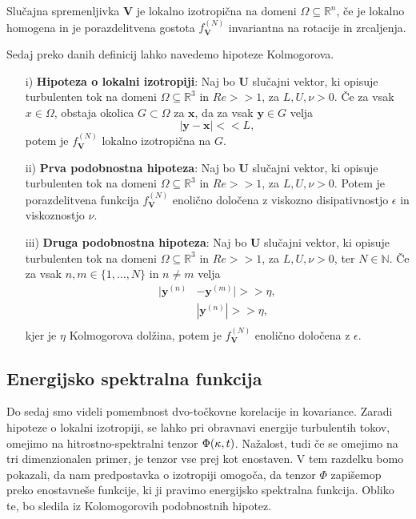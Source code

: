 \documentclass[mat2, tisk]{fmfdelo}
\newcommand{\R}{\mathbb R}
\newcommand{\N}{\mathbb N}
\newcommand{\bd}{\textbf}
\begin{document}
\begin{definicija}
Slučajna spremenljivka $\bd{V}$ je lokalno izotropična na domeni 
$\Omega \subseteq \R^n$, če je lokalno homogena in je porazdelitvena 
gostota $f_\bd{V}^{(N)}$ invariantna na rotacije in zrcaljenja.
\end{definicija}

Sedaj preko danih definicij lahko navedemo hipoteze Kolmogorova.

\begin{enumerate}
  \item[i)] \textbf{Hipoteza o lokalni izotropiji}: Naj bo $\bd{U}$ slučajni vektor,
  ki opisuje turbulenten tok na domeni $\Omega \subseteq \R^3$ in $Re >\!\!> 1$, za $L, U, \nu > 0$. Če 
  za vsak $x\in \Omega$, obstaja okolica $G \subset \Omega$ za $\bd{x}$, da za vsak 
  $\bd{y}\in G$ velja $$ |\bd{y} - \bd{x}| <\!\!< L,$$ potem je $f_\bd{V}^{(N)}$ lokalno 
  izotropična na $G$.
  \item[ii)] \textbf{Prva podobnostna hipoteza}: Naj bo $\bd{U}$ slučajni vektor,
  ki opisuje turbulenten tok na domeni $\Omega \subseteq \R^3$ in $Re >\!\!> 1$, za $L, U, \nu > 0$.
  Potem je porazdelitvena funkcija $f_\bd{V}^{(N)}$ enolično določena 
  z viskozno disipativnostjo $\epsilon$ in viskoznostjo $\nu$.
  \item[iii)] \textbf{Druga podobnostna hipoteza}: Naj bo $\bd{U}$ slučajni vektor,
  ki opisuje turbulenten tok na domeni $\Omega \subseteq \R^3$ in $Re >\!\!> 1$, za $L, U, \nu > 0$, ter $N\in \N$.
  Če za vsak $n, m \in \{1, \dots, N\}$ in $n\neq m$ velja 
  \begin{align*}
  |\bd{y}^{(n)} &- \bd{y}^{(m)}| >\!\!> \eta,\\
  &|\bd{y}^{(n)}|>\!\!> \eta, \\
\end{align*}
kjer je $\eta$ Kolmogorova dolžina, potem je $f_\bd{V}^{(N)}$ enolično 
določena z $\epsilon$.
\end{enumerate}

\subsection{Energijsko spektralna funkcija}

Do sedaj smo videli pomembnost dvo-točkovne korelacije in kovariance. 
Zaradi hipoteze o lokalni izotropiji, se lahko pri obravnavi 
energije turbulentih tokov, omejimo na hitrostno-spektralni tenzor $\Phi(\text{\bd{$\kappa$}}, t)$. 
Nažalost, tudi če se omejimo na tri dimenzionalen primer, 
je tenzor vse prej kot enostaven. V tem razdelku bomo pokazali, 
da nam predpostavka o izotropiji omogoča, da tenzor $\Phi$ zapišemop 
preko enostavneše funkcije, ki ji pravimo energijsko spektralna funkcija.
Obliko te, bo sledila iz Kolomogorovih podobnostnih hipotez. 
\end{document}
